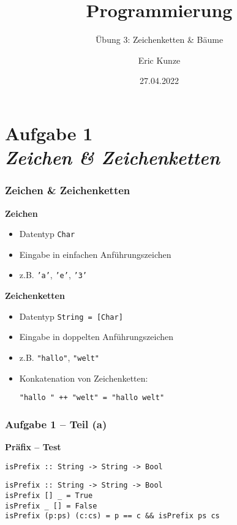 \documentclass{beamer}
\begin{document}
	
	\title{Programmierung}
	\subtitle{Übung 3: Zeichenketten \& Bäume}
	\author{Eric Kunze}
	\date{27.04.2022}
	
	\maketitle



\section{Aufgabe 1 \\ \textit{\normalsize Zeichen \& Zeichenketten}}

	\begin{frame}[fragile] \frametitle{Zeichen \& Zeichenketten}
		\textbf{Zeichen}
		\begin{itemize}
			\item Datentyp \texttt{Char}
			\item Eingabe in einfachen Anführungszeichen
			\item z.B. \texttt{'a'}, \texttt{'e'}, \texttt{'3'}
		\end{itemize}
		\pause
		\textbf{Zeichenketten}
		\begin{itemize}
			\item Datentyp \texttt{String = [Char]}
			\item Eingabe in doppelten Anführungszeichen
			\item z.B. \texttt{"hallo"}, \texttt{"welt"}
			\item Konkatenation von Zeichenketten: \\[6pt] 
			\begin{lstlisting}[style=bg]
"hallo " ++ "welt" = "hallo welt"
			\end{lstlisting}
		\end{itemize}
	\end{frame}

\begin{frame}[t, fragile] \frametitle{Aufgabe 1 -- Teil (a)}
	\textbf{Präfix -- Test}
	
	\texttt{isPrefix :: String -> String -> Bool}
	
	\pause \bigskip
	
	\begin{lstlisting}[style=bg]
isPrefix :: String -> String -> Bool
isPrefix [] _ = True
isPrefix _ [] = False
isPrefix (p:ps) (c:cs) = p == c && isPrefix ps cs
	\end{lstlisting}
\end{frame}
\end{document}
